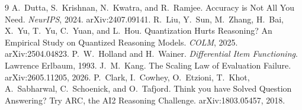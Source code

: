 \documentclass[11pt]{article}
\begin{document}
\begin{thebibliography}{9}
 A.~Dutta, S.~Krishnan, N.~Kwatra, and R.~Ramjee. Accuracy is Not All You Need. \emph{NeurIPS}, 2024. arXiv:2407.09141.
 R.~Liu, Y.~Sun, M.~Zhang, H.~Bai, X.~Yu, T.~Yu, C.~Yuan, and L.~Hou. Quantization Hurts Reasoning? An Empirical Study on Quantized Reasoning Models. \emph{COLM}, 2025. arXiv:2504.04823.
 P.~W.~Holland and H.~Wainer. \emph{Differential Item Functioning}. Lawrence Erlbaum, 1993.
 J.~M.~Kang. The Scaling Law of Evaluation Failure. arXiv:2605.11205, 2026.
 P.~Clark, I.~Cowhey, O.~Etzioni, T.~Khot, A.~Sabharwal, C.~Schoenick, and O.~Tafjord. Think you have Solved Question Answering? Try ARC, the AI2 Reasoning Challenge. arXiv:1803.05457, 2018.
\end{thebibliography}
\end{document}
